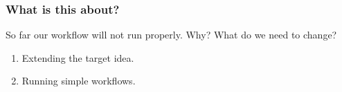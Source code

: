 \begin{frame}
  \frametitle{What is this about?}
   \begin{question}[Questions]
      So far our workflow will not run properly. Why? What do we need to change?
   \end{question}
   \begin{docs}[Objectives]
   	  \begin{enumerate}
                      \item Extending the target idea.
                      \item Running simple workflows.
      \end{enumerate}
    \end{docs}
\end{frame}
%
%
%
